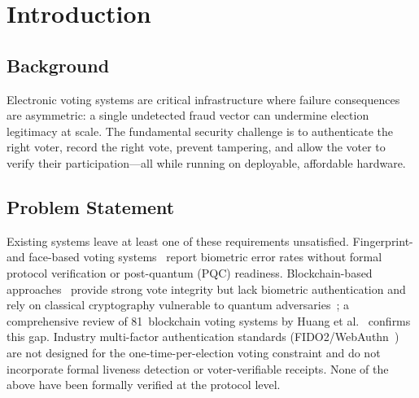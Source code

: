 \documentclass[pdflatex,sn-mathphys-num]{sn-jnl}%
\theoremstyle{thmstyleone}%
\theoremstyle{thmstyletwo}%
\theoremstyle{thmstylethree}%
\begin{document}

\maketitle

\section{Introduction}\label{sec:intro}

\subsection{Background}

Electronic voting systems are critical infrastructure where failure consequences
are asymmetric: a single undetected fraud vector can undermine election
legitimacy at scale. The fundamental security challenge is to authenticate the
right voter, record the right vote, prevent tampering, and allow the voter to
verify their participation—all while running on deployable, affordable hardware.

\subsection{Problem Statement}

Existing systems leave at least one of these requirements unsatisfied.
Fingerprint- and face-based voting systems~\cite{bello2021biometric,
sanchez2020biometric,komatineni2020biometric,nagaraj2022voting} report biometric
error rates without formal protocol verification or post-quantum (PQC)
readiness. Blockchain-based approaches~\cite{ayed2017conceptual,
hardwick2018voting,faruk2024transforming} provide strong vote integrity but lack
biometric authentication and rely on classical cryptography vulnerable to quantum
adversaries~\cite{bernstein2017post}; a comprehensive review of 81~blockchain
voting systems by Huang et al.~\cite{huang2022blockchain_voting} confirms this
gap. Industry multi-factor authentication standards
(FIDO2/WebAuthn~\cite{fido2_webauthn}) are not designed for the
one-time-per-election voting constraint and do not incorporate formal liveness
detection or voter-verifiable receipts. None of the above have been formally
verified at the protocol level.
\end{document}
